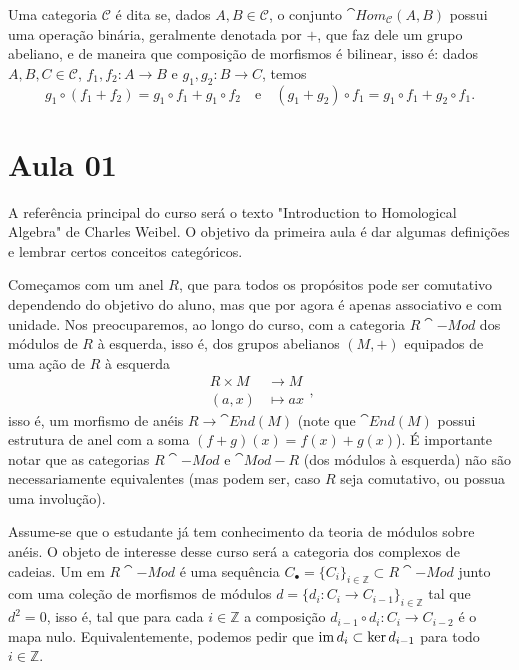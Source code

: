 Uma categoria $\mathcal{C}$ é dita  se, dados $A, B \in \mathcal{C}$, o conjunto $\cat{Hom}_\mathcal{C}(A,B)$ possui uma operação binária, geralmente denotada por $+$, que faz dele um grupo abeliano, e de maneira que composição de morfismos é bilinear, isso é: dados $A, B, C \in \mathcal{C}$, $f_1, f_2 \colon A \to B$ e $g_1, g_2 \colon B \to C$, temos \begin{equation}
    g_1 \circ (f_1 + f_2) = g_1 \circ f_1 + g_1 \circ f_2 \quad \text{e} \quad (g_1 + g_2) \circ f_1 = g_1 \circ f_1 + g_2 \circ f_1.
\end{equation}

\section{Aula 01}

A referência principal do curso será o texto "Introduction to Homological Algebra" de Charles Weibel. O objetivo da primeira aula é dar algumas definições e lembrar certos conceitos categóricos.

Começamos com um anel $R$, que para todos os propósitos pode ser comutativo dependendo do objetivo do aluno, mas que por agora é apenas associativo e com unidade. Nos preocuparemos, ao longo do curso, com a categoria $R\cat{-Mod}$ dos módulos de $R$ à esquerda, isso é, dos grupos abelianos $(M, +)$ equipados de uma ação de $R$ à esquerda \begin{equation}
    \begin{split}
        R \times M &\to M \\ (a, x) &\mapsto ax
    \end{split},
\end{equation} isso é, um morfismo de anéis $R \to \cat{End}(M)$ (note que $\cat{End}(M)$ possui estrutura de anel com a soma $(f + g)(x) = f(x) + g(x)$). É importante notar que as categorias $R\cat{-Mod}$ e $\cat{Mod-}R$ (dos módulos à esquerda) não são necessariamente equivalentes (mas podem ser, caso $R$ seja comutativo, ou possua uma involução).

Assume-se que o estudante já tem conhecimento da teoria de módulos sobre anéis. O objeto de interesse desse curso será a categoria dos complexos de cadeias. Um  em $R\cat{-Mod}$ é uma sequência $C_\bullet = \{C_i\}_{i \in \mathbb{Z}} \subset R\cat{-Mod}$ junto com uma coleção de morfismos de módulos $d = \{d_i \colon C_i \to C_{i-1}\}_{i \in \mathbb{Z}}$ tal que $d^2 = 0$, isso é, tal que para cada $i \in \mathbb{Z}$ a composição $d_{i - 1} \circ d_i \colon C_i \to C_{i - 2}$ é o mapa nulo. Equivalentemente, podemos pedir que $\operatorname{im} d_i \subset \ker d_{i - 1}$ para todo $i \in \mathbb{Z}$.

